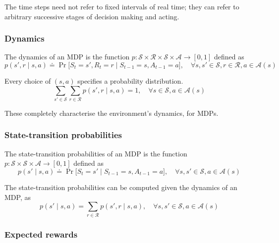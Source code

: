 The time steps need not refer to fixed intervals of real time; they can refer to arbitrary successive stages of decision making and acting.

\subsubsection{Dynamics}

The dynamics of an MDP is the function \( p: \mathcal{S} \times \mathcal{R} \times \mathcal{S} \times \mathcal{A} \to [0, 1] \) defined as
\begin{equation}
    p(s', r \mid s, a) \doteq \Pr \big[ S_{t} = s', R_{t} = r \mid S_{t-1} = s, A_{t-1} = a \big]
    , \quad \forall s, s' \in \mathcal{S}, r \in \mathcal{R}, a \in \mathcal{A}(s)
\end{equation}

Every choice of \( (s, a) \) specifies a probability distribution.
\begin{equation}
    \sum_{s' \in \mathcal{S}} \sum_{r \in \mathcal{R}} p(s', r \mid s, a) = 1
    , \quad \forall s \in \mathcal{S}, a \in \mathcal{A}(s)
\end{equation}

These completely characterise the environment's dynamics, for MDPs.

\subsubsection{State-transition probabilities}

The state-transition probabilities of an MDP is the function \( p: \mathcal{S} \times \mathcal{S} \times \mathcal{A} \to [0, 1] \) defined as
\begin{equation}
    p(s' \mid s, a) \doteq \Pr \big[ S_{t} = s' \mid S_{t-1} = s, A_{t-1} = a \big]
    , \quad \forall s, s' \in \mathcal{S}, a \in \mathcal{A}(s)
\end{equation}

The state-transition probabilities can be computed given the dynamics of an MDP, as
\begin{equation}
    p(s' \mid s, a) = \sum_{r \in \mathcal{R}} p(s', r \mid s, a)
    , \quad \forall s, s' \in \mathcal{S}, a \in \mathcal{A}(s)
\end{equation}

\subsubsection{Expected rewards}

